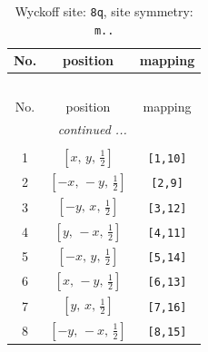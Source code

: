 \documentclass[fleqn,8pt]{jsarticle}
\begin{document}
\begin{longtable}{ccc}
\caption{Wyckoff site: {\tt 8q}, site symmetry: {\tt m..}}
 \\
 \hline \hline
No. & position & mapping \\ \hline \endfirsthead

\multicolumn{2}{l}{\tablename\ \thetable{}} \\
 \hline \hline
No. & position & mapping \\ \hline \endhead

 \hline \hline
\multicolumn{2}{r}{\footnotesize\it continued ...} \\ \endfoot

 \hline \hline
\multicolumn{2}{r}{} \\ \endlastfoot

1 & $\left[ x,\, y,\, \frac{1}{2} \right]$ & {\tt [1,10]} \\ \hline
2 & $\left[ - x,\, - y,\, \frac{1}{2} \right]$ & {\tt [2,9]} \\ \hline
3 & $\left[ - y,\, x,\, \frac{1}{2} \right]$ & {\tt [3,12]} \\ \hline
4 & $\left[ y,\, - x,\, \frac{1}{2} \right]$ & {\tt [4,11]} \\ \hline
5 & $\left[ - x,\, y,\, \frac{1}{2} \right]$ & {\tt [5,14]} \\ \hline
6 & $\left[ x,\, - y,\, \frac{1}{2} \right]$ & {\tt [6,13]} \\ \hline
7 & $\left[ y,\, x,\, \frac{1}{2} \right]$ & {\tt [7,16]} \\ \hline
8 & $\left[ - y,\, - x,\, \frac{1}{2} \right]$ & {\tt [8,15]} \\
\end{longtable}
\renewcommand{\arraystretch}{1.2}
\end{document}
